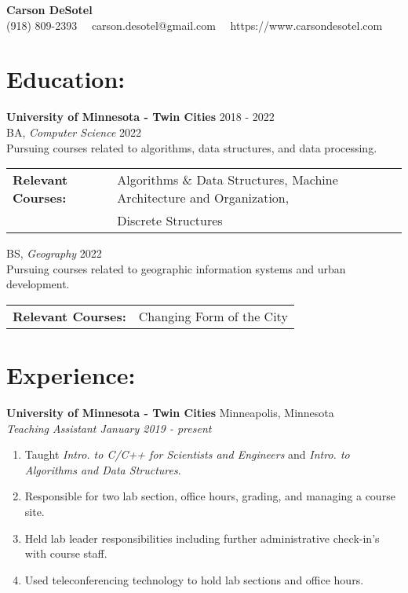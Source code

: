 \documentclass[10pt]{article}
\begin{document}
	\begin{center}
		{\LARGE \textbf{Carson DeSotel}} \\
		\vspace{5pt} 		%
		(918) 809-2393 \ \textbullet \
		carson.desotel@gmail.com \ \textbullet \
		https://www.carsondesotel.com \
		
	\end{center}
	
	\hrulefill
	
	\section*{Education:}
		\textbf{University of Minnesota - Twin Cities} \hfill 2018 - 2022 \\
		\indent BA, \textit{Computer Science} \hfill 2022 \\
		\indent \indent Pursuing courses related to algorithms, data structures, and data processing. \\
		\indent \indent 
		\begin{tabular}{@{}l@{\ }l}
		\textbf{Relevant Courses: } & Algorithms \& Data Structures, Machine Architecture and Organization, \\ & Discrete Structures \\
		\end{tabular}
		
		\vspace{5pt}
		
		\indent BS, \textit{Geography} \hfill 2022 \\
		\indent \indent Pursuing courses related to geographic information systems and urban development. \\
		\indent \indent
		\begin{tabular}{@{}l@{\ }l}
		\textbf{Relevant Courses: } & Changing Form of the City \\
		\end{tabular}
		
	\hrulefill
	
	\section*{Experience:}
		\textbf{University of Minnesota - Twin Cities} \hfill Minneapolis, Minnesota \\
		\textit{Teaching Assistant \hfill January 2019 - present }
		\begin{enumerate}[label=--]
			\item Taught \textit{Intro. to C/C++ for Scientists and Engineers} and \textit{Intro. to Algorithms and Data Structures}.
			\item Responsible for two lab section, office hours, grading, and managing a course site.
			\item Held lab leader responsibilities including further administrative check-in's with course staff.
			\item Used teleconferencing technology to hold lab sections and office hours.
		\end{enumerate}
	
\end{document}
